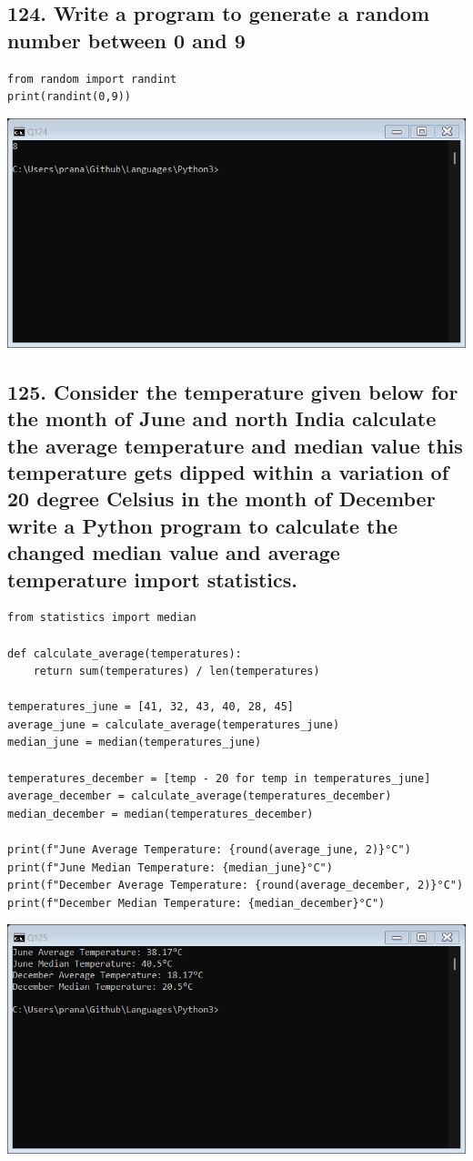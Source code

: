 \documentclass[12pt]{article}
\begin{document}
\subsection*{124. Write a program to generate a random
number between 0 and 9}
\begin{verbatim}
from random import randint
print(randint(0,9))
\end{verbatim}
\includegraphics[width=\linewidth]{images/124.png}

\subsection*{125. Consider the temperature given below for
the month of June and north India calculate the
average temperature and median value this
temperature gets dipped within a variation of 20
degree Celsius in the month of December write a
Python program to calculate the changed median
value and average temperature
import statistics.}
\begin{verbatim}
from statistics import median

def calculate_average(temperatures):
    return sum(temperatures) / len(temperatures)
    
temperatures_june = [41, 32, 43, 40, 28, 45]
average_june = calculate_average(temperatures_june)
median_june = median(temperatures_june)
    
temperatures_december = [temp - 20 for temp in temperatures_june]
average_december = calculate_average(temperatures_december)
median_december = median(temperatures_december)
    
print(f"June Average Temperature: {round(average_june, 2)}°C")
print(f"June Median Temperature: {median_june}°C")
print(f"December Average Temperature: {round(average_december, 2)}°C")
print(f"December Median Temperature: {median_december}°C")    
\end{verbatim}
\includegraphics[width=\linewidth]{images/125.png}
\end{document}
